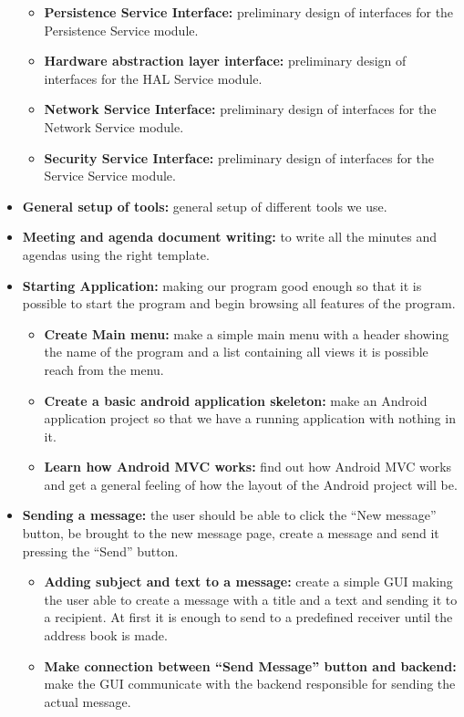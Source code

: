 \begin{itemize}
\begin{itemize}
\item{}\textbf{Persistence Service Interface:} preliminary design of interfaces for the Persistence Service module.
\item{}\textbf{Hardware abstraction layer interface:} preliminary design of interfaces for the HAL Service module.
\item{}\textbf{Network Service Interface:} preliminary design of interfaces for the Network Service module.
\item{}\textbf{Security Service Interface:} preliminary design of interfaces for the Service Service module.
\end{itemize}
\item{}\textbf{General setup of tools:} general setup of different tools we use.
\item{}\textbf{Meeting and agenda document writing:} to write all the minutes and agendas using the right template.
\item{}\textbf{Starting Application:} making our program good enough so that it is possible to start the program and begin browsing all features of the program.
\begin{itemize}
\item{}\textbf{Create Main menu:} make a simple main menu with a header showing the name of the program and a list containing all views it is possible reach from the menu.
\item{}\textbf{Create a basic android application skeleton:} make an Android application project so that we have a running application with nothing in it.
\item{}\textbf{Learn how Android MVC works:} find out how Android MVC works and get a general feeling of how the layout of the Android project will be.
\end{itemize}
\item{}\textbf{Sending a message:} the user should be able to click the “New message” button, be brought to the new message page, create a message and send it pressing the “Send” button.
\begin{itemize}
\item{}\textbf{Adding subject and text to a message:} create a simple GUI making the user able to create a message with a title and a text and sending it to a recipient. At first it is enough to send to a predefined receiver until the address book is made.
\item{}\textbf{Make connection between “Send Message” button and backend:} make the GUI communicate with the backend responsible for sending the actual message.

\end{itemize}
\end{itemize}
